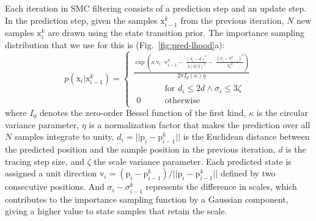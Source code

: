 Each iteration in SMC filtering consists of a prediction step and an update step. In the prediction step, given the samples $\mathrm{x}_{i-1}^k$ from the previous iteration, $N$ new samples $\mathrm{x}_i^k$ are drawn using the state transition prior. The importance sampling distribution that we use for this is (Fig.~\ref{fig:pred-lhood}a):
\begin{equation}
p(\mathrm{x}_i  | \mathrm{x}_{i-1}^k) =
\begin{cases}
\displaystyle\frac{\exp\left(\kappa\,\mathrm{v}_i \cdot \mathrm{v}_{i-1}^k -\ \frac{(d_i-d)^2}{2 (d/3)^2} -\ \frac{(\sigma_i-\sigma_{i-1}^k)^2}{2\zeta^2} \right)}{2 \pi I_0(\kappa)\eta} \\[2ex]
\begin{aligned}
  & \qquad\text{for $d_i \leq 2d \land \sigma_i \leq 3\zeta$} \\
0 & \qquad\text{otherwise}
\end{aligned}
\end{cases}
\label{eq:pred}
\end{equation}
where $I_0$ denotes the zero-order Bessel function of the first kind, $\kappa$ is the circular variance parameter, $\eta$ is a normalization factor that makes the prediction over all $N$ samples integrate to unity, $d_i= || \mathrm{p}_i - \mathrm{p}_{i-1}^k ||$ is the Euclidean distance between the predicted position and the sample position in the previous iteration, $d$ is the tracing step size, and $\zeta$ the scale variance parameter. Each predicted state is assigned a unit direction $\mathrm{v}_i = (\mathrm{p}_i - \mathrm{p}_{i-1}^k) / || \mathrm{p}_i - \mathrm{p}_{i-1}^k ||$ defined by two consecutive positions. And $\sigma_i-\sigma_{i-1}^k$ represents the difference in scales, which contributes to the importance sampling function by a Gaussian component, giving a higher value to state samples that retain the scale.

